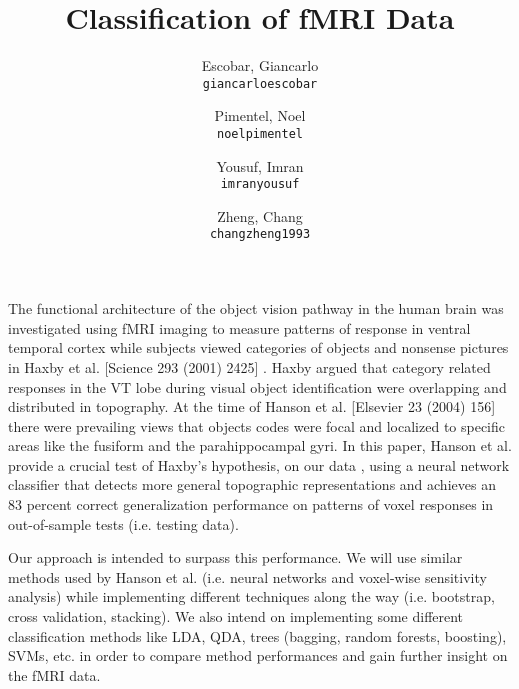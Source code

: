 \documentclass[11pt]{article}
\title{Classification of fMRI Data}
\author{
  Escobar, Giancarlo\\
  \texttt{giancarloescobar}
  \and
  Pimentel, Noel\\
  \texttt{noelpimentel}
  \and
  Yousuf, Imran\\
  \texttt{imranyousuf}
  \and
  Zheng, Chang\\
  \texttt{changzheng1993}
}
\begin{document}
\maketitle

The functional architecture of the object vision pathway in the human brain was investigated using fMRI imaging to measure patterns of response in ventral temporal cortex while subjects viewed categories of objects and nonsense pictures in Haxby et al. [Science 293 (2001) 2425]  . Haxby argued that category related responses in the VT lobe during visual object identification were overlapping and distributed in topography. At the time of Hanson et al. [Elsevier 23 (2004) 156] \cite {hanson2004combinatorial} there were prevailing views that objects codes were focal and localized to specific areas like the fusiform and the parahippocampal gyri.  In this paper, Hanson et al. provide a crucial test of Haxby's hypothesis, on our data \cite {haxby2001vor}, using a neural network classifier that detects more general topographic representations and achieves an 83 percent correct generalization performance on patterns of voxel responses in out-of-sample tests (i.e. testing data).  

Our approach is intended to surpass this performance.  We will use similar methods used by Hanson et al. (i.e. neural networks and voxel-wise sensitivity analysis) while implementing different techniques along the way (i.e. bootstrap, cross validation, stacking). We also intend on implementing some different classification methods like LDA, QDA, trees (bagging, random forests, boosting), SVMs, etc. in order to compare method performances and gain further insight on the fMRI data.


\end{document}
